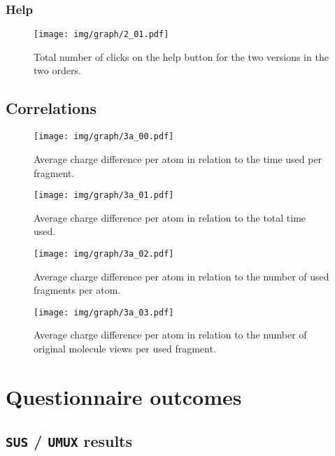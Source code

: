 \subsubsection{Help}
\nlipsum

\begin{figure}
\center
\texttt{[image: img/graph/2\_01.pdf]}
\caption{Total number of clicks on the help button for the two versions in the two orders.}
\end{figure}

\subsection{Correlations}
\nlipsum

\begin{figure}
\center
\texttt{[image: img/graph/3a\_00.pdf]}
\caption{Average charge difference per atom in relation to the time used per fragment.}
\end{figure}

\begin{figure}
\center
\texttt{[image: img/graph/3a\_01.pdf]}
\caption{Average charge difference per atom in relation to the total time used.}
\end{figure}

\begin{figure}
\center
\texttt{[image: img/graph/3a\_02.pdf]}
\caption{Average charge difference per atom in relation to the number of used fragments per atom.}
\end{figure}

\begin{figure}
\center
\texttt{[image: img/graph/3a\_03.pdf]}
\caption{Average charge difference per atom in relation to the number of original molecule views per used fragment.}
\end{figure}


\section{Questionnaire outcomes}
\nlipsum

\subsection{\texttt{SUS} / \texttt{UMUX} results}
\nlipsum

